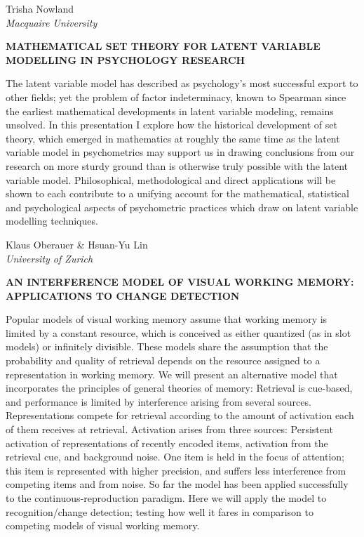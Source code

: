 \documentclass[]{article}
\begin{document}
Trisha Nowland\\
\emph{Macquaire University}

\textbf{MATHEMATICAL SET THEORY FOR LATENT VARIABLE MODELLING IN
PSYCHOLOGY RESEARCH}

The latent variable model has described as psychology's most successful
export to other fields; yet the problem of factor indeterminacy, known
to Spearman since the earliest mathematical developments in latent
variable modeling, remains unsolved. In this presentation I explore how
the historical development of set theory, which emerged in mathematics
at roughly the same time as the latent variable model in psychometrics
may support us in drawing conclusions from our research on more sturdy
ground than is otherwise truly possible with the latent variable model.
Philosophical, methodological and direct applications will be shown to
each contribute to a unifying account for the mathematical, statistical
and psychological aspects of psychometric practices which draw on latent
variable modelling techniques.\\
\pagebreak  

Klaus Oberauer \& Hsuan-Yu Lin\\
\emph{University of Zurich}

\textbf{AN INTERFERENCE MODEL OF VISUAL WORKING MEMORY: APPLICATIONS TO
CHANGE DETECTION}

Popular models of visual working memory assume that working memory is
limited by a constant resource, which is conceived as either quantized
(as in slot models) or infinitely divisible. These models share the
assumption that the probability and quality of retrieval depends on the
resource assigned to a representation in working memory. We will present
an alternative model that incorporates the principles of general
theories of memory: Retrieval is cue-based, and performance is limited
by interference arising from several sources. Representations compete
for retrieval according to the amount of activation each of them
receives at retrieval. Activation arises from three sources: Persistent
activation of representations of recently encoded items, activation from
the retrieval cue, and background noise. One item is held in the focus
of attention; this item is represented with higher precision, and
suffers less interference from competing items and from noise. So far
the model has been applied successfully to the continuous-reproduction
paradigm. Here we will apply the model to recognition/change detection;
testing how well it fares in comparison to competing models of visual
working memory.\\
\pagebreak  
\end{document}
